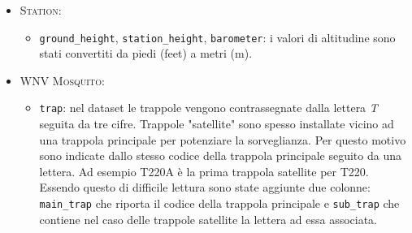 \begin{itemize}
\begin{itemize}
            \item \texttt{stn\_pressure}, \texttt{sea\_level}: i valori di 
                pressione sono stati convertiti da pollici di mercurio (inHg) a 
                millimetri di mercurio (mmHg).

            \item \texttt{result\_speed}, \texttt{avg\_speed}, \texttt{max5\_speed}, 
            	\texttt{max2\_speed}: i valori di velocità sono stati convertiti da
            	miglia orarie (mph) a chilometri orari 
            	(\si[per-mode=symbol]{\km\per\hour}).
            
            \item \texttt{code\_sum}: questo attributo corrisponde ad una lista di 
            	codici che possono essere assegnati a ciascuna rilevazione, 
            	corrispondenti ai diversi tipi di precipitazioni e altri fenomeni
            	meteorologici (ad es. pioggia, neve, nebbia, \dots). Dato che a 
            	ciascuna rilevazione può essere assegnato più di un codice, è stato
            	necessario effettuare un parsing dei valori, creando una colonna per
				ogni codice utilizzato.
        \end{itemize}
	
	\item \textsc{Station}:
	\begin{itemize}
    	\item \texttt{ground\_height}, \texttt{station\_height}, 
    	\texttt{barometer}: i valori di altitudine sono stati convertiti da
    	piedi (feet) a metri (m).
	\end{itemize}
		
	\item \textsc{WNV Mosquito}:
	
	\begin{itemize}
		
		\item \texttt{trap}: nel dataset le trappole vengono contrassegnate 
		dalla lettera \textit{T} seguita da tre cifre. Trappole "satellite" 
		sono spesso installate vicino ad una trappola principale per potenziare 
		la sorveglianza. Per questo motivo sono indicate dallo stesso codice 
		della trappola principale seguito da una lettera. Ad esempio T220A è la 
		prima trappola satellite per T220. Essendo questo di difficile lettura 
		sono state aggiunte due colonne: \texttt{main\_trap} che riporta il 
		codice della trappola principale e \texttt{sub\_trap} che contiene nel 
		caso delle trappole satellite la lettera ad essa associata.
		

\end{itemize}
\end{itemize}
